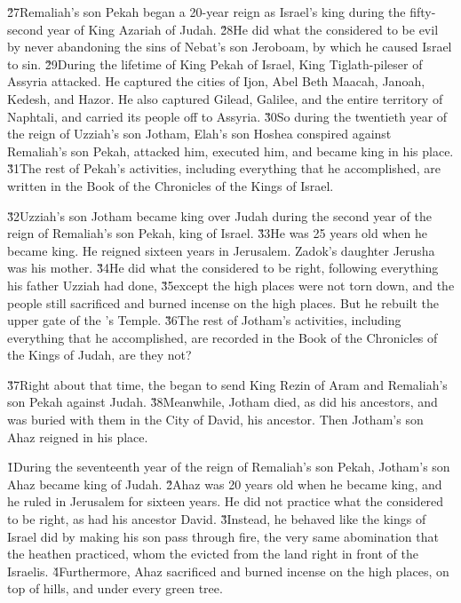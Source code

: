\v{27}Remaliah's son Pekah began a 20-year reign as Israel's king during the fifty-second year of King Azariah of Judah. \v{28}He did what the  considered to be evil by never abandoning the sins of Nebat's son Jeroboam, by which he caused Israel to sin. \v{29}During the lifetime of King Pekah of Israel, King Tiglath-pileser of Assyria attacked. He captured the cities of Ijon, Abel Beth Maacah, Janoah, Kedesh, and Hazor. He also captured Gilead, Galilee, and the entire territory of Naphtali, and carried its people off to Assyria. \v{30}So during the twentieth year of the reign of Uzziah's son Jotham, Elah's son Hoshea conspired against Remaliah's son Pekah, attacked him, executed him, and became king in his place. \v{31}The rest of Pekah's activities, including everything that he accomplished, are written in the Book of the Chronicles of the Kings of Israel.

\v{32}Uzziah's son Jotham became king over Judah during the second year of the reign of Remaliah's son Pekah, king of Israel. \v{33}He was 25 years old when he became king. He reigned sixteen years in Jerusalem. Zadok's daughter Jerusha was his mother. \v{34}He did what the  considered to be right, following everything his father Uzziah had done, \v{35}except the high places were not torn down, and the people still sacrificed and burned incense on the high places. But he rebuilt the upper gate of the 's Temple. \v{36}The rest of Jotham's activities, including everything that he accomplished, are recorded in the Book of the Chronicles of the Kings of Judah, are they not?

\v{37}Right about that time, the  began to send King Rezin of Aram and Remaliah's son Pekah against Judah. \v{38}Meanwhile, Jotham died, as did his ancestors, and was buried with them in the City of David, his ancestor. Then Jotham's son Ahaz reigned in his place.

\v{1}During the seventeenth year of the reign of Remaliah's son Pekah, Jotham's son Ahaz became king of Judah. \v{2}Ahaz was 20 years old when he became king, and he ruled in Jerusalem for sixteen years. He did not practice what the  considered to be right, as had his ancestor David. \v{3}Instead, he behaved like the kings of Israel did by making his son pass through fire, the very same abomination that the heathen practiced, whom the  evicted from the land right in front of the Israelis. \v{4}Furthermore, Ahaz sacrificed and burned incense on the high places, on top of hills, and under every green tree.

